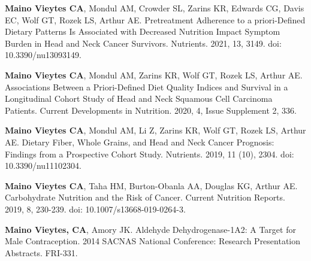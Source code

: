\begin{cvskills}

  \cvskill
    {} %
    {\textbf{Maino Vieytes CA}, Mondul AM, Crowder SL, Zarins KR, Edwards CG, Davis EC, Wolf GT, Rozek LS, Arthur AE. Pretreatment Adherence to a priori-Defined Dietary Patterns Is Associated with Decreased Nutrition Impact Symptom Burden in Head and Neck Cancer Survivors. Nutrients. 2021, 13, 3149. doi: 10.3390/nu13093149.} %



  \cvskill
    {} %
    {\textbf{Maino Vieytes CA}, Mondul AM, Zarins KR, Wolf GT, Rozek LS, Arthur AE. Associations Between a Priori-Defined Diet Quality Indices and Survival in a Longitudinal Cohort Study of Head and Neck Squamous Cell Carcinoma Patients. Current Developments in Nutrition. 2020, 4, Issue Supplement 2, 336.} %



  \cvskill
    {} %
    {\textbf{Maino Vieytes CA}, Mondul AM, Li Z, Zarins KR, Wolf GT, Rozek LS, Arthur AE. Dietary Fiber, Whole Grains, and Head and Neck Cancer Prognosis: Findings from a Prospective Cohort Study. Nutrients. 2019, 11 (10), 2304. doi: 10.3390/nu11102304.} %



  \cvskill
    {} %
    {\textbf{Maino Vieytes CA}, Taha HM, Burton-Obanla AA, Douglas KG, Arthur AE. Carbohydrate Nutrition and the Risk of Cancer. Current Nutrition Reports. 2019, 8, 230-239. doi: 10.1007/s13668-019-0264-3.} %



  \cvskill
    {} %
    {\textbf{Maino Vieytes, CA}, Amory JK. Aldehyde Dehydrogenase-1A2: A Target for Male Contraception. 2014 SACNAS National Conference: Research Presentation Abstracts. FRI-331.} %


\end{cvskills}

